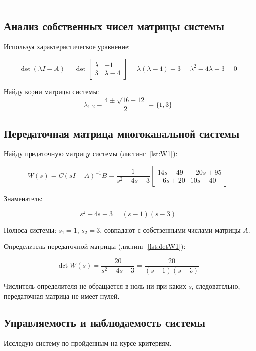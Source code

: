 \documentclass[a4paper,12pt]{article}
\begin{document}
	\hrule \newpage \subsection{Анализ собственных чисел матрицы системы}
	
	Используя характеристическое уравнение:
	
	\[
	\det(\lambda I - A) = \det\begin{bmatrix}
		\lambda & -1 \\
		3 & \lambda - 4
	\end{bmatrix} = \lambda(\lambda - 4) + 3 = \lambda^2 - 4\lambda + 3 = 0
	\]
	
	Найду корни матрицы системы:
	\[
	\lambda_{1,2} = \frac{4 \pm \sqrt{16 - 12}}{2} = \{1, 3\}
	\]
	
	\subsection{Передаточная матрица многоканальной системы}
	
	Найду предаточную матрицу системы (листинг~\ref{lst:W1}):
	
	\[
	W(s) = C(sI - A)^{-1}B = 
	\frac{1}{s^2 - 4s + 3}
	\begin{bmatrix}
		14s - 49 & -20s + 95 \\
		-6s + 20 & 10s - 40
	\end{bmatrix}
	\]
	
	Знаменатель:
	
	\[
	s^2 - 4s + 3 = (s - 1)(s - 3)
	\]
	
	Полюса системы: $s_1 = 1$, $s_2 = 3$, совпадают с собственными числами матрицы $A$.
	
	
	Определитель передаточной матрицы (листинг~\ref{lst:detW1}):
	
	\[
	\det W(s) = \frac{20}{s^2 - 4s + 3} = \frac{20}{(s - 1)(s - 3)}
	\]
	
	Числитель определителя не обращается в ноль ни при каких $s$, следовательно, передаточная матрица не имеет нулей.
	
	\subsection{Управляемость и наблюдаемость системы}
	
	Исследую систему по пройденным на курсе критериям.
	
\end{document}
